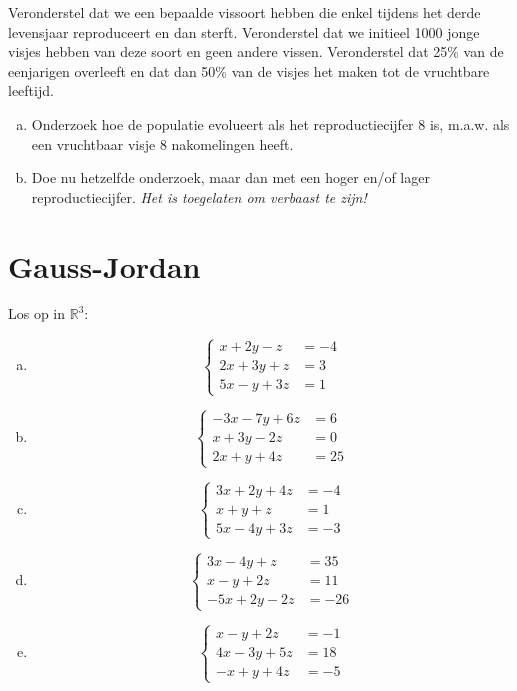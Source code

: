 \documentclass[12pt,twoside]{article}
\begin{document}
\begin{oefening}
Veronderstel dat we een bepaalde vissoort hebben die enkel tijdens het derde levensjaar reproduceert en dan sterft. Veronderstel dat we initieel 1000 jonge visjes hebben van deze soort en geen andere vissen. Veronderstel dat 25\% van de eenjarigen overleeft en dat dan 50\% van de visjes het maken tot de vruchtbare leeftijd.
\begin{enumerate}[(a)]
  \item Onderzoek hoe de populatie evolueert als het reproductiecijfer 8 is, m.a.w. als een vruchtbaar visje 8 nakomelingen heeft.
  \item Doe nu hetzelfde onderzoek, maar dan met een hoger en/of lager reproductiecijfer. {\em Het is toegelaten om verbaast te zijn!}
\end{enumerate}
\end{oefening}

\pagebreak
\section{Gauss-Jordan}

\begin{oefening}
Los op in $\mathbb{R}^3$:
\begin{multicols}{2}
\begin{enumerate}[(a)]
  \item$$\left\{
\begin{aligned}
  x + 2y -z &= -4\\
  2x+3y+z   &= 3\\
  5x-y+3z   &= 1
\end{aligned}\right.$$
  \item$$\left\{
\begin{aligned}
  -3x -7y +6z &= 6\\
  x+3y-2z   &= 0\\
  2x+y+4z   &= 25
\end{aligned}\right.$$
  \item$$\left\{
\begin{aligned}
  3x +2y +4z &= -4\\
  x+y+z   &= 1\\
  5x-4y+3z   &= -3
\end{aligned}\right.$$
  \item$$\left\{
\begin{aligned}
  3x -4y +z &= 35\\
  x-y+2z   &= 11\\
  -5x+2y-2z   &= -26
\end{aligned}\right.$$
  \item$$\left\{
\begin{aligned}
  x -y + 2z &= -1\\
  4x-3y+5z   &= 18\\
  -x+y+4z   &= -5
\end{aligned}\right.$$
\end{enumerate}
\end{multicols}
\end{oefening}
\end{document}
